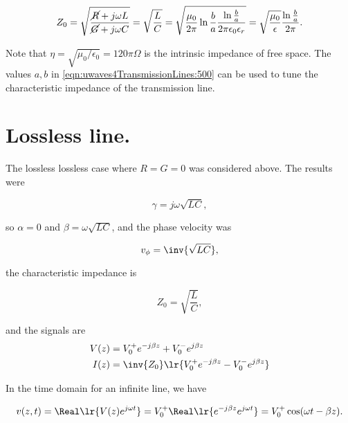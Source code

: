 {\begin{dmath}\label{eqn:uwaves4TransmissionLines:500}
Z_0 
= \sqrt{ \frac{\cancel{R} + j \omega L}{\cancel{G} + j \omega C} } 
= \sqrt{ \frac{L}{C} }
= \sqrt{
\frac{\mu_0}{ 2 \pi } \ln \frac{b}{a}
\frac{ \ln \frac{b}{a} } 
{2 \pi \epsilon_0 \epsilon_r }
}
=
\sqrt{ \frac{\mu_0}{\epsilon} } \frac{ \ln \frac{b}{a} }{ 2 \pi }.
\end{dmath}

Note that \( \eta = \sqrt{\mu_0/\epsilon_0} = 120 \pi \Omega \) is the intrinsic impedance of free space.  The values \( a, b \) in \cref{eqn:uwaves4TransmissionLines:500} can be used to tune the characteristic impedance of the transmission line.

} %

\section{Lossless line.}

The lossless lossless case where \( R = G = 0 \) was considered above.  The results were

\begin{dmath}\label{eqn:uwaves4TransmissionLines:540}
\gamma = j \omega \sqrt{ L C },
\end{dmath}

so \( \alpha = 0 \) and \( \beta = \omega \sqrt{LC} \), and the phase velocity was

\begin{dmath}\label{eqn:uwaves4TransmissionLines:560}
v_\phi = \inv{\sqrt{LC}},
\end{dmath}

the characteristic impedance is

\begin{dmath}\label{eqn:uwaves4TransmissionLines:580}
Z_0 = \sqrt{\frac{L}{C}},
\end{dmath}

and the signals are
\begin{equation}\label{eqn:uwaves4TransmissionLines:600}
\begin{aligned}
V(z) &= V_0^{+} e^{-j \beta z} + V_0^{-} e^{j \beta z} \\
I(z) &= \inv{Z_0} \lr{ V_0^{+} e^{-j \beta z} - V_0^{-} e^{j \beta z} } 
\end{aligned}
\end{equation}

In the time domain for an infinite line, we have

\begin{dmath}\label{eqn:uwaves4TransmissionLines:620}
v(z, t) 
= \Real\lr{ V(z) e^{j \omega t} } 
= V_0^{+} \Real\lr{ e^{-j \beta z} e^{j \omega t} }
= V_0^{+} \cos( \omega t - \beta z ).
\end{dmath}

